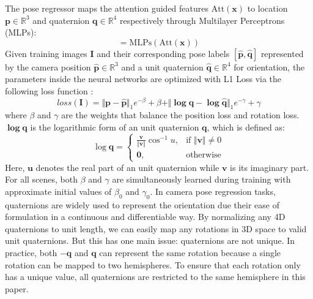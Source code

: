 \documentclass[letterpaper]{article}
\begin{document}
The pose regressor maps the attention guided features $\text{Att}(\mathbf{x})$ to location $\mathbf{p} \in \mathbb{R}^3 $ and quaternion $\mathbf{q} \in \mathbb{R}^4 $ respectively through Multilayer Perceptrons (MLPs): 
    \begin{equation}
        [\mathbf{p}, \mathbf{q}] = \text{MLPs}(\text{Att}(\mathbf{x}))
    \end{equation}
Given training images $\mathbf{I}$ and their corresponding pose labels $\mathbf{[\hat{p}, \hat{q}]}$ represented by the camera position $\mathbf{\hat{p}} \in \mathbb{R}^3 $ and a unit quaternion $\mathbf{\hat{q}} \in \mathbb{R}^4 $ for orientation, the parameters inside the neural networks are optimized with L1 Loss via the following loss function \cite{brahmbhatt2018geometry}:
\begin{equation}
	loss(\mathbf{I}) =\Vert \mathbf{p}-\mathbf{\hat{p}} \Vert_{1} e^{-\beta} + \beta +
    \Vert \mathbf{\log q}-\mathbf{\log \hat{q}} \Vert_{1} e^{-\gamma} + \gamma
	\label{eq:loss}
\end{equation}
where $\beta$ and $\gamma$ are the weights that balance the position loss and rotation loss.
$\mathbf{\log q}$ is the logarithmic form of an unit quaternion $\mathbf{q}$, which is defined as:
\begin{equation}
    \log\mathbf{q}= \begin{cases}
            \frac{\mathbf{v}}{\Vert\mathbf{v}\Vert}\cos^{-1}u,& \text{if } \Vert\mathbf{v}\Vert \neq 0\\
            \mathbf{0},& \text{otherwise}
        \end{cases}
\end{equation}
Here, $\mathbf{u}$ denotes the real part of an unit quaternion while $\mathbf{v}$ is its imaginary part. For all scenes, both $\beta$ and $\gamma$ are simultaneously learned during training with approximate initial values of $\beta_0$ and $\gamma_0$. In camera pose regression tasks, quaternions are widely used to represent the orientation due their ease  of formulation in a continuous and differentiable way. By normalizing any 4D quaternions to unit length, we can easily map any rotations in 3D space to valid unit quaternions. But this has one main issue: quaternions are not unique. In practice, both $\mathbf{-q}$ and $\mathbf{q}$ can represent the same rotation because a single rotation can be mapped to two hemispheres. To ensure that each rotation only has a unique value, all quaternions are restricted to the same hemisphere in this paper.
\end{document}
